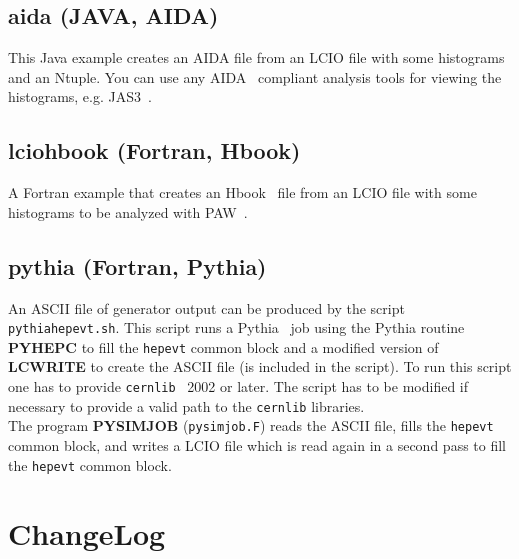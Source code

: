 \documentclass[twoside]{article}
\begin{document}
\subsection{aida (JAVA, AIDA)} \label{rwaida}

This Java example creates an AIDA file from an LCIO file with some histograms
and an Ntuple. You can use any AIDA~\cite{ref_aida} compliant analysis tools for 
viewing the histograms, e.g. JAS3~\cite{ref_jas}.

\subsection{lciohbook (Fortran, Hbook)} \label{rwhbook}

A Fortran example that creates an Hbook~\cite{ref_cernlib} file from an LCIO file with 
some histograms to be analyzed with PAW~\cite{ref_cernlib}.

\subsection{pythia (Fortran, Pythia)} \label{rwpythia}

An ASCII file of generator output can be produced by the script \verb$pythiahepevt.sh$.
This script runs a Pythia~\cite{ref_pythia} job
using the Pythia routine {\bf PYHEPC} to fill the \verb$hepevt$ common block 
and a modified version of {\bf LCWRITE} to create the ASCII file (is included in the script). To run this script
one has to provide \verb$cernlib$~\cite{ref_cernlib} 2002 or later. The script has to be modified if necessary
to provide a valid path to the \verb$cernlib$ libraries. \\
The program {\bf PYSIMJOB} (\verb$pysimjob.F$) reads the ASCII file, fills the \verb$hepevt$ common 
block, and writes a LCIO file which is read again in a second pass to fill the \verb$hepevt$ common 
block.


\newpage 
\begin{latexonly}
\end{latexonly}

\section{ChangeLog}
\end{document}
